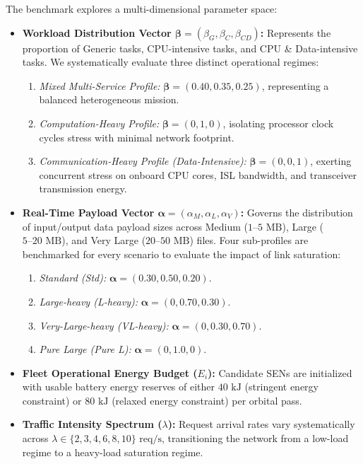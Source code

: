 The benchmark explores a multi-dimensional parameter space:
\begin{itemize}
    \item \textbf{Workload Distribution Vector $\boldsymbol{\beta} = (\beta_G, \beta_C, \beta_{CD})$:} Represents the proportion of Generic tasks, CPU-intensive tasks, and CPU \& Data-intensive tasks. We systematically evaluate three distinct operational regimes:
    \begin{enumerate}
        \item \textit{Mixed Multi-Service Profile:} $\boldsymbol{\beta} = (0.40, 0.35, 0.25)$, representing a balanced heterogeneous mission.
        \item \textit{Computation-Heavy Profile:} $\boldsymbol{\beta} = (0, 1, 0)$, isolating processor clock cycles stress with minimal network footprint.
        \item \textit{Communication-Heavy Profile (Data-Intensive):} $\boldsymbol{\beta} = (0, 0, 1)$, exerting concurrent stress on onboard CPU cores, ISL bandwidth, and transceiver transmission energy.
    \end{enumerate}

    \item \textbf{Real-Time Payload Vector $\boldsymbol{\alpha} = (\alpha_M, \alpha_L, \alpha_V)$:} Governs the distribution of input/output data payload sizes across Medium ($1\text{--}5\text{ MB}$), Large ($5\text{--}20\text{ MB}$), and Very Large ($20\text{--}50\text{ MB}$) files. Four sub-profiles are benchmarked for every scenario to evaluate the impact of link saturation:
    \begin{enumerate}
        \item \textit{Standard (Std):} $\boldsymbol{\alpha} = (0.30, 0.50, 0.20)$.
        \item \textit{Large-heavy (L-heavy):} $\boldsymbol{\alpha} = (0, 0.70, 0.30)$.
        \item \textit{Very-Large-heavy (VL-heavy):} $\boldsymbol{\alpha} = (0, 0.30, 0.70)$.
        \item \textit{Pure Large (Pure L):} $\boldsymbol{\alpha} = (0, 1.0, 0)$.
    \end{enumerate}

    \item \textbf{Fleet Operational Energy Budget ($E_{i}$):} Candidate SENs are initialized with usable battery energy reserves of either $40\text{ kJ}$ (stringent energy constraint) or $80\text{ kJ}$ (relaxed energy constraint) per orbital pass.

    \item \textbf{Traffic Intensity Spectrum ($\lambda$):} Request arrival rates vary systematically across $\lambda \in \{2, 3, 4, 6, 8, 10\}\text{ req/s}$, transitioning the network from a low-load regime to a heavy-load saturation regime.
\end{itemize}

